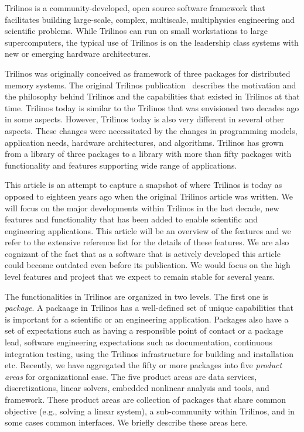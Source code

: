

Trilinos is a community-developed, open source software framework that facilitates building large-scale, complex, multiscale, multiphysics engineering and scientific problems. While Trilinos can run on small workstations to large supercomputers, the typical use of Trilinos is on the leadership class systems with new or emerging hardware architectures.

Trilinos was originally conceived as framework of three packages for distributed memory systems. The original Trilinos publication~\cite{Heroux2005a} describes the motivation and the philosophy behind Trilinos and the capabilities that existed in Trilinos at that time. Trilinos today is similar to the Trilinos that was envisioned two decades ago in some aspects. However, Trilinos today is also very different in several other aspects. These changes were necessitated by the changes in programming models, application needs, hardware architectures, and algorithms. Trilinos has grown from a library of three packages to a library with more than fifty packages with functionality and features supporting wide range of applications.

This article is an attempt to capture a snapshot of where Trilinos is today as opposed to eighteen years ago when the original Trilinos article was written. We will focus on the major developments within Trilinos in the last decade, new features and functionality that has been added to enable scientific and engineering applications. This article will be an overview of the features and we refer to the extensive reference list for the details of these features. We are also cognizant of the fact that as a software that is actively developed this article could become outdated even before its publication. We would focus on the high level features and project that we expect to remain stable for several years.

The functionalities in Trilinos are organized in two levels. The first one is \textit{package}. A packaage in Trilinos has a well-defined set of unique capabilities that is important for a scientific or an engineering application. Packages also have a set of expectations such as having a responsible point of contact or a package lead, software engineering expectations such as documentation, continuous integration testing, using the Trilinos infrastructure for building and installation etc. Recently, we have aggregated the fifty or more packages into five \textit{product areas} for organizational ease. The five product areas are data services, discretizations, linear solvers, embedded nonlinear analysis and tools, and framework. These product areas are collection of packages that share common objective (e.g., solving a linear system), a sub-community within Trilinos, and in some cases common interfaces. We briefly describe these areas here.

